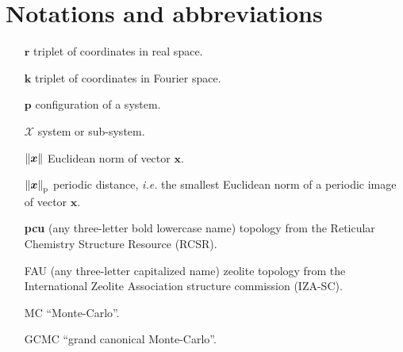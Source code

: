 \section*{Notations and abbreviations}
\begin{itemize}
    \item[$\boldsymbol r$] triplet of coordinates in real space.
    \item[$\boldsymbol k$] triplet of coordinates in Fourier space.
    \item[$\boldsymbol p$] configuration of a system.
    \item[$\mathcal X$] system or sub-system.
    \item[$\left\|\boldsymbol x\right\|$] Euclidean norm of vector $\boldsymbol x$.
    \item[$\left\|\boldsymbol x\right\|_\text{p}$] periodic distance, \textit{i.e.} the smallest Euclidean norm of a periodic image of vector $\boldsymbol x$.
    \item[\bfseries{pcu}] (any three-letter bold lowercase name) topology from the Reticular Chemistry Structure Resource (RCSR).
    \item[FAU] (any three-letter capitalized name) zeolite topology from the International Zeolite Association structure commission (IZA-SC).
    \item[MC] ``Monte-Carlo''.
    \item[GCMC] ``grand canonical Monte-Carlo''.
\end{itemize}
